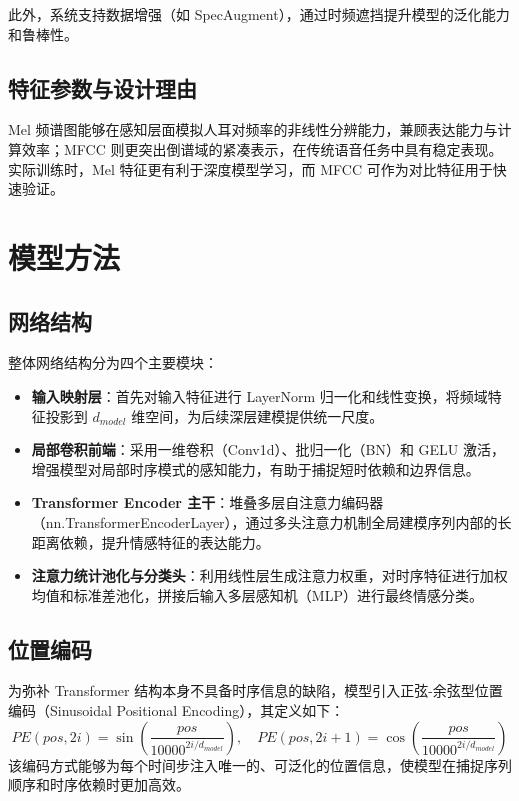 \documentclass[UTF8, a4paper，12pt]{ctexart}
\begin{document}
此外，系统支持数据增强（如 SpecAugment），通过时频遮挡提升模型的泛化能力和鲁棒性。

\subsection{特征参数与设计理由}
Mel 频谱图能够在感知层面模拟人耳对频率的非线性分辨能力，兼顾表达能力与计算效率；MFCC 则更突出倒谱域的紧凑表示，在传统语音任务中具有稳定表现。实际训练时，Mel 特征更有利于深度模型学习，而 MFCC 可作为对比特征用于快速验证。

\section{模型方法}
\subsection{网络结构}

整体网络结构分为四个主要模块：
\begin{itemize}
  \item \textbf{输入映射层}：首先对输入特征进行 LayerNorm 归一化和线性变换，将频域特征投影到 $d_{model}$ 维空间，为后续深层建模提供统一尺度。
  \item \textbf{局部卷积前端}：采用一维卷积（Conv1d）、批归一化（BN）和 GELU 激活，增强模型对局部时序模式的感知能力，有助于捕捉短时依赖和边界信息。
  \item \textbf{Transformer Encoder 主干}：堆叠多层自注意力编码器（nn.TransformerEncoderLayer），通过多头注意力机制全局建模序列内部的长距离依赖，提升情感特征的表达能力。
  \item \textbf{注意力统计池化与分类头}：利用线性层生成注意力权重，对时序特征进行加权均值和标准差池化，拼接后输入多层感知机（MLP）进行最终情感分类。
\end{itemize}

\subsection{位置编码}

为弥补 Transformer 结构本身不具备时序信息的缺陷，模型引入正弦-余弦型位置编码（Sinusoidal Positional Encoding），其定义如下：
\begin{equation}
PE(pos,2i)=\sin\left(\frac{pos}{10000^{2i/d_{model}}}\right),\quad
PE(pos,2i+1)=\cos\left(\frac{pos}{10000^{2i/d_{model}}}\right)
\end{equation}
该编码方式能够为每个时间步注入唯一的、可泛化的位置信息，使模型在捕捉序列顺序和时序依赖时更加高效。
\end{document}
